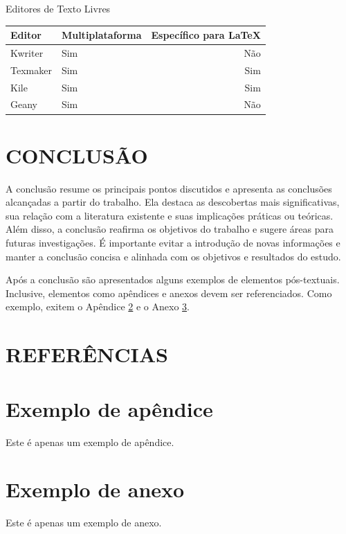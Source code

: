 \documentclass[estagio]{iftex2024}
\begin{document}
\begin{board}[!htb] \centering
\caption{Editores de Texto Livres} \label{quadro:editores_texto_livres}
\begin{varwidth}{\linewidth}
\begin{tabular}{|l|l|r|}        \hline
Editor     & Multiplataforma & Específico para LaTeX \\ \hline
Kwriter    & Sim             & Não                   \\
Texmaker   & Sim             & Sim                   \\
Kile       & Sim             & Sim                   \\
Geany      & Sim             & Não                   \\ \hline
\end{tabular}
\end{varwidth}
\end{board}

\chapter{CONCLUSÃO}

A conclusão resume os principais pontos discutidos e apresenta as conclusões alcançadas a partir do trabalho.
Ela destaca as descobertas mais significativas, sua relação com a literatura existente e suas implicações práticas ou teóricas.
Além disso, a conclusão reafirma os objetivos do trabalho e sugere áreas para futuras investigações.
É importante evitar a introdução de novas informações e manter a conclusão concisa e alinhada com os objetivos e resultados do estudo.

Após a conclusão são apresentados alguns exemplos de elementos pós-textuais.
Inclusive, elementos como apêndices e anexos devem ser referenciados.
Como exemplo, exitem o Apêndice \ref{ap:exemplo} e o Anexo \ref{an:exemplo}.

\chapter*{REFERÊNCIAS}

\printbibliography

\appendix

\chapter{Exemplo de apêndice} \label{ap:exemplo}

Este é apenas um exemplo de apêndice.

\attachment

\chapter{Exemplo de anexo} \label{an:exemplo}

Este é apenas um exemplo de anexo.
\end{document}

